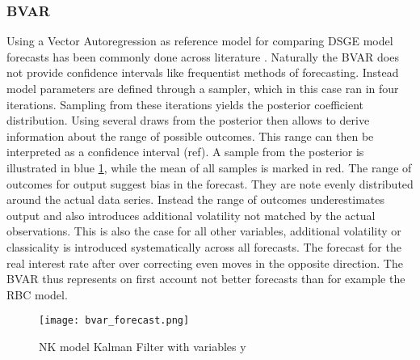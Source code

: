 \documentclass[12pt,a4paper,english]{article} %
\begin{document}
	\subsubsection{BVAR} \label{forecast_bvar}
	Using a Vector Autoregression as reference model for comparing DSGE model forecasts has been commonly done across literature \cite{schorfheide_loss_2000, chin_bayesian_2019}. 
	Naturally the BVAR does not provide confidence intervals like frequentist methods of forecasting. Instead model parameters are defined through a sampler, which in this case ran in four iterations. Sampling from these iterations yields the posterior coefficient distribution. Using several draws from the posterior then allows to derive information about the range of possible outcomes. This range can then be interpreted as a confidence interval (ref).  
	A sample from the posterior is illustrated in blue \ref{fig:bvar}, while the mean of all samples is marked in red. The range of outcomes for output suggest bias in the forecast. They are note evenly distributed around the actual data series. Instead the range of outcomes underestimates output and also introduces additional volatility not matched by the actual observations. This is also the case for all other variables, additional volatility or classicality is introduced systematically across all forecasts. The forecast for the real interest rate after over correcting even moves in the opposite direction. 
	The BVAR thus represents on first account not better forecasts than for example the RBC model.
	\begin{figure}[H]
		\begin{center}
			\texttt{[image: bvar\_forecast.png]}
			\caption{NK model Kalman Filter with variables y}\label{fig:bvar}
		\end{center}
	\end{figure}
	
\end{document}
